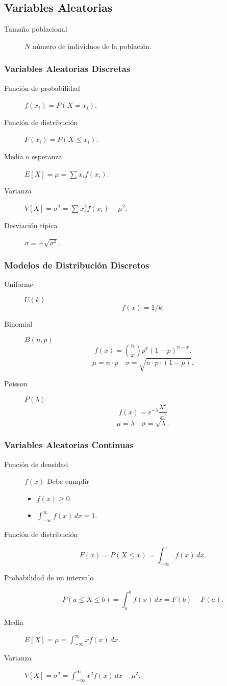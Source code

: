 \documentclass[a4paper]{article}
\newlength{\mylength}
\newenvironment{marco}{
	\setlength{\fboxsep}{5pt}
	\setlength{\mylength}{\textwidth}
	\addtolength{\mylength}{-2\fboxsep}
	\addtolength{\mylength}{-2\fboxrule}
	\noindent
	\begin{Sbox}
	\begin{minipage}{\mylength}
	\setlength{\abovedisplayskip}{3pt}
	\setlength{\belowdisplayskip}{3pt}
}
{
	\end{minipage}
	\end{Sbox}
	\fbox{\TheSbox}
}
\begin{document}
\subsection*{Variables Aleatorias}
\begin{marco}
\begin{multicols}{2}
\begin{description}
\item [Tamaño poblacional] $N$ número de individuos de la población.
\end{description}
\subsubsection*{Variables Aleatorias Discretas}
\begin{description}
\item [Función de probabilidad] $f(x_i)=P(X=x_i)$.
\item [Función de distribución] $F(x_i)=P(X\leq x_i)$.
\item [Media o esperanza] $E[X]=\mu=\sum x_if(x_i)$.
\item [Varianza] $V[X]=\sigma^2=\sum x_i^2f(x_i)-\mu^2$.
\item [Desviación típica] $\sigma=+\sqrt{\sigma^2}$.
\end{description}
\subsubsection*{Modelos de Distribución Discretos}
\begin{description}
\item [Uniforme] $U(k)$
\[f(x)=1/k.\]
\item [Binomial] $B(n,p)$
\[f(x)=\binom{n}{x}p^x(1-p)^{n-x}.\]
\[\mu=n\cdot p\quad \sigma=\sqrt{n\cdot p\cdot (1-p)}.\]
\item [Poisson] $P(\lambda)$
\[f(x)=e^{-\lambda}\frac{\lambda^x}{x!}\]
\[\mu=\lambda\quad \sigma=\sqrt{\lambda}.\]
\end{description}
\subsubsection*{Variables Aleatorias Continuas}
\begin{description}
\item [Función de densidad] $f(x)$ Debe cumplir
\begin{itemize}
\item $f(x)\geq 0$.
\item $\int_{-\infty}^\infty f(x)\,dx=1$.
\end{itemize}
\item [Función de distribución] \[F(x)=P(X\leq x)=\int_{-\infty}^x f(x)\,dx.\]
\item [Probabilidad de un intervalo]
\[P(a\leq X\leq b)=\int_a^b f(x)\,dx=F(b)-F(a).\]
\item [Media] $E[X]=\mu=\int_{-\infty}^\infty xf(x)\,dx$.
\item [Varianza] $V[X]=\sigma^2=\int_{-\infty}^\infty x^2f(x)\,dx-\mu^2$.
\end{description}

\end{multicols}
\end{marco}
\end{document}
